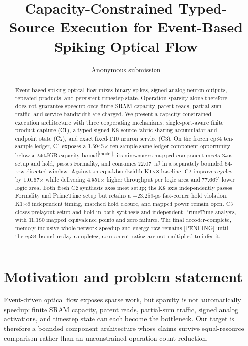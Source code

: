 \documentclass[9pt,twocolumn]{article}
\title{Capacity-Constrained Typed-Source Execution for Event-Based Spiking Optical Flow}
\author{Anonymous submission}
\date{}
\newcommand{\modeltag}{\textsuperscript{[model]}}
\newcommand{\pending}{\textcolor{red!70!black}{[PENDING]}}
\begin{document}
\maketitle

\begin{abstract}
Event-based spiking optical flow mixes binary spikes, signed analog neuron
outputs, repeated products, and persistent timestep state.  Operation sparsity
alone therefore does not guarantee speedup once finite SRAM capacity, parent
reads, partial-sum traffic, and service bandwidth are charged.  We present a
capacity-constrained execution architecture with three cooperating mechanisms:
single-port-aware finite product capture (C1), a typed signed K8 source fabric
sharing accumulator and endpoint state (C2), and exact fixed-T10 neuron service
(C3).  On the frozen ep34 ten-sample ledger, C1 exposes a
1.6945$\times$ ten-sample
same-ledger component opportunity below a 240-KiB capacity bound\modeltag;
its nine-macro mapped component meets 3-ns setup and hold, passes Formality, and
consumes 22.07~nJ in a separately bounded 64-row directed window.  Against an
equal-bandwidth K1$\times$8 baseline, C2 improves cycles by 1.0167$\times$ while
delivering 4.551$\times$ higher throughput per logic area and 77.66\% lower
logic area.  Both fresh C2 synthesis axes meet setup; the K8 axis independently
passes Formality and PrimeTime setup but retains a $-23.259$-ps fast-corner hold
violation.  K1$\times$8 independent timing, matched hold closure, and mapped
power remain open.  C3 closes prelayout
setup and hold in both synthesis and independent PrimeTime analysis, with 11,180
mapped equivalence points and zero failures.  The final decoder-complete,
memory-inclusive whole-network speedup and energy row remains \pending{} until
the ep34-bound replay completes; component ratios are not multiplied to infer it.
\end{abstract}

\section{Motivation and problem statement}
Event-driven optical flow exposes sparse work, but sparsity is not automatically
speedup: finite SRAM capacity, parent reads, partial-sum traffic, signed analog
activations, and timestep state can each become the bottleneck.  Our target is
therefore a bounded component architecture whose claims survive equal-resource
comparison rather than an unconstrained operation-count reduction.
\end{document}
